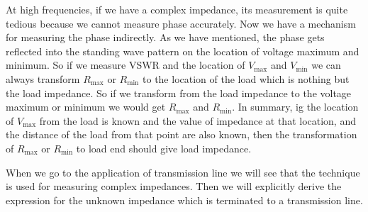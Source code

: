 At high frequencies, if we have a complex impedance, its measurement is quite tedious because we cannot measure phase accurately. Now we have a mechanism for measuring the phase indirectly. As we have mentioned, the phase gets reflected into the standing wave pattern on the location of voltage maximum and minimum. So if we measure VSWR and the location of $V_{\max}$ and $V_{\min}$ we can always transform $R_{\max}$ or $R_{\min}$ to the location of the load which is nothing but the load impedance. So if we transform from the load impedance to the voltage maximum or minimum we would get $R_{\max}$ and $R_{\min}$. In summary, ig the location of $V_{\max}$ from the load is known and the value of impedance at that location, and the distance of the load from that point are also known, then the transformation of $R_{\max}$ or $R_{\min}$ to load end should give load impedance.

When we go to the application of transmission line we will see that the technique is used for measuring complex impedances. Then we will explicitly derive the expression for the unknown impedance which is terminated to a transmission line. 